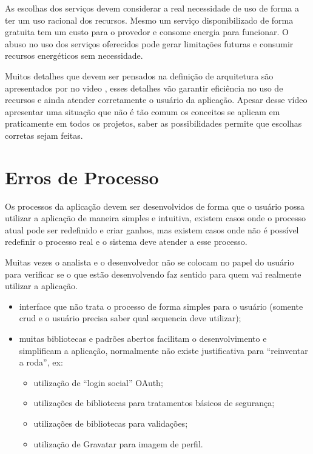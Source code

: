 As escolhas dos serviços devem considerar a real necessidade de uso de forma a ter um uso racional dos recursos. Mesmo um serviço disponibilizado de forma gratuita tem um custo para o provedor e consome energia para funcionar. O abuso no uso dos serviços oferecidos pode gerar limitações futuras e consumir recursos energéticos sem necessidade.

Muitos detalhes que devem ser pensados na definição de arquitetura são apresentados por  no video , esses detalhes vão garantir eficiência no uso de recursos e ainda atender corretamente o usuário da aplicação. Apesar desse vídeo apresentar uma situação que não é tão comum os conceitos se aplicam em praticamente em todos os projetos, saber as possibilidades permite que escolhas corretas sejam feitas.


\section{Erros de Processo}

Os processos da aplicação devem ser desenvolvidos de forma que o usuário possa utilizar a aplicação de maneira simples e intuitiva, existem casos onde o processo atual pode ser redefinido e criar ganhos, mas existem casos onde não é possível redefinir o processo real e o sistema deve atender a esse processo.

Muitas vezes o analista e o desenvolvedor não se colocam no papel do usuário para verificar se o que estão desenvolvendo faz sentido para quem vai realmente utilizar a aplicação. 

\begin{itemize}
    \item interface que não trata o processo de forma simples para o usuário (somente \gls{crud} e o usuário precisa saber qual sequencia deve utilizar);
    
    \item muitas bibliotecas e padrões abertos facilitam o desenvolvimento e simplificam a aplicação, normalmente não existe justificativa para \enquote{reinventar a roda}, ex: 
      \begin{itemize}
          \item utilização de \enquote{login social} OAuth;

          \item utilizações de bibliotecas para tratamentos básicos de segurança;
          
          \item utilizações de bibliotecas para validações;
          
          \item utilização de Gravatar para imagem de perfil.
      \end{itemize}
\end{itemize}

